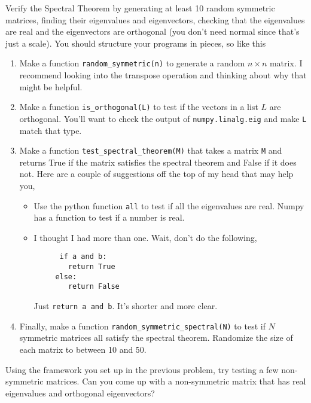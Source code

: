 \documentclass[11pt,letterpaper]{article}
\begin{document}
\begin{problem}
 Verify the Spectral Theorem by generating at least 10 random symmetric matrices, finding their eigenvalues and eigenvectors, checking that the eigenvalues are real and the eigenvectors are orthogonal (you don't need normal since that's just a scale). You should structure your programs in pieces, so like this
 \begin{enumerate}
  \item Make a function \texttt{random\_symmetric(n)} to generate a random $n\times n$ matrix. I recommend looking into the transpose operation and thinking about why that might be helpful.
  \item Make a function \texttt{is\_orthogonal(L)} to test if the vectors in a list $L$ are orthogonal. You'll want to check the output of \texttt{numpy.linalg.eig} and make \texttt{L} match that type. 
  \item Make a function \texttt{test\_spectral\_theorem(M)} that takes a matrix \texttt{M} and returns True if the matrix satisfies the spectral theorem and False if it does not. Here are a couple of suggestions off the top of my head that may help you,
   \begin{itemize}
    \item Use the python function \texttt{all} to test if all the eigenvalues are real. Numpy has a function to test if a number is real.
    \item I thought I had more than one. Wait, don't do the following,
    \begin{verbatim}
      if a and b:
      	return True
     else:
     	return False
    \end{verbatim}
    Just \texttt{return a and b}. It's shorter and more clear.
   \end{itemize}
   \item Finally, make a function \texttt{random\_symmetric\_spectral(N)} to test if $N$ symmetric matrices all satisfy the spectral theorem. Randomize the size of each matrix to between 10 and 50.
 \end{enumerate}
\end{problem}


\begin{problem}
 Using the framework you set up in the previous problem, try testing a few non-symmetric matrices. Can you come up with a non-symmetric matrix that has real eigenvalues and orthogonal eigenvectors?
\end{problem}
\end{document}
